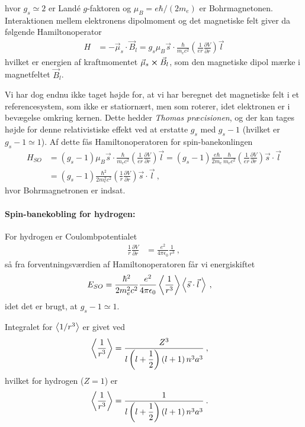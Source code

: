 hvor $g_s \simeq 2$ er Landé $g$-faktoren og $\mu_B = e\hbar/(2m_e)$ er Bohrmagnetonen.\\
Interaktionen mellem elektronens dipolmoment og det magnetiske felt giver da følgende Hamiltonoperator
\begin{align}
    H &= - \Vec{\mu}_s \cdot \Vec{B}_l = g_s \mu_B \Vec{s} \cdot \frac{\hbar}{m_e c^2} \left(\frac{1}{e r} \frac{\partial V}{\partial r} \right) \Vec{l}
\end{align}
hvilket er energien af kraftmomentet $\Vec{\mu}_s \cross \Vec{B}_l$, som den magnetiske dipol mærke i magnetfeltet $\Vec{B}_l$.

Vi har dog endnu ikke taget højde for, at vi har beregnet det magnetiske felt i et referencesystem, som ikke er statiornært, men som roterer, idet elektronen er i bevægelse omkring kernen. Dette hedder \emph{Thomas præcisionen}, og der kan tages højde for denne relativistiske effekt ved at erstatte $g_s$ med $g_s - 1$ (hvilket er $g_s - 1 \simeq 1$). Af dette fås Hamiltonoperatoren for spin-banekonlingen
\begin{align}
    H_{SO} &= (g_s - 1) \mu_B \Vec{s} \cdot \frac{\hbar}{m_e c^2} \left(\frac{1}{e r} \frac{\partial V}{\partial r} \right) \Vec{l} = (g_s - 1) \frac{e\hbar}{2m_e} \frac{\hbar}{m_e c^2} \left(\frac{1}{e r} \frac{\partial V}{\partial r} \right) \Vec{s} \cdot \Vec{l} \nonumber\\
    &= (g_s - 1) \frac{\hbar^2}{2m_e^2c^2} \left(\frac{1}{r} \frac{\partial V}{\partial r} \right) \Vec{s} \cdot \Vec{l} \: ,
\end{align}
hvor Bohrmagnetronen er indsat.\\


\paragraph{Spin-banekobling for hydrogen:}
For hydrogen er Coulombpotentialet
\begin{align}
    \frac{1}{r} \frac{\partial V}{\partial r} &= \frac{e^2}{4\pi\epsilon_0} \frac{1}{r^3} \: ,
\end{align}
så fra forventningsværdien af Hamiltonoperatoren får vi energiskiftet
\begin{align}
    E_{SO} &= \frac{\hbar^2}{2m_e^2c^2} \frac{e^2}{4\pi\epsilon_0} \Braket{\frac{1}{r^3}} \Braket{\Vec{s} \cdot \Vec{l} \:} \: ,
\end{align}
idet det er brugt, at $g_s - 1 \simeq 1$.

Integralet for $\Braket{1/r^3}$ er givet ved
\begin{align}
    \Braket{\frac{1}{r^3}} &= \dfrac{Z^3}{l\left(l+\dfrac{1}{2}\right)\left(l + 1\right) n^3a^3} \: ,
\end{align}
hvilket for hydrogen ($Z = 1$) er
\begin{align} \label{eq:Q10_<1/r^3>ForHydrogen}
    \Braket{\frac{1}{r^3}} &= \dfrac{1}{l\left(l+\dfrac{1}{2}\right)\left(l + 1\right) n^3a^3} \: .
\end{align}

